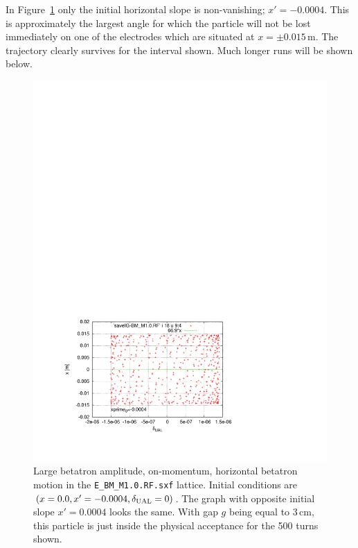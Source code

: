 \documentclass[]{article}
\begin{document}
In Figure~\ref{fig:PureBetatron_BM_Z} only 
the initial horizontal slope is non-vanishing; $x'=-0.0004$. 
This is approximately the largest angle for which the
particle will not be lost immediately on one of the electrodes
which are situated at $x=\pm0.015\,$m.
The trajectory clearly survives for the interval shown.
Much longer runs will be shown below.
%
\begin{figure}[h]
\begin{minipage}[b]{\linewidth}
\centering
\includegraphics[scale=0.8]{pdf/PureBetatronMinus_BM_M1p0.pdf}
\end{minipage}
\caption{\label{fig:PureBetatron_BM_Z}Large betatron amplitude,
on-momentum, horizontal betatron motion 
in the {\tt E\_BM\_M1.0.RF.sxf} lattice. 
Initial conditions are $(x=0.0,x'=-0.0004,\delta_{\rm UAL}=0)$.
The graph with opposite initial slope $x'=0.0004$ looks the same.
With gap $g$ being equal to 3\,cm,
this particle is just inside the physical acceptance for
the 500 turns shown.
}
\end{figure}
%
\end{document}
